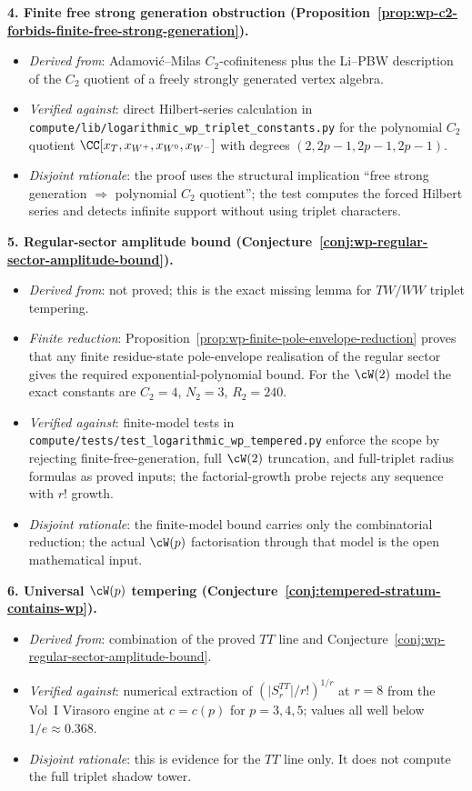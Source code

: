 \textbf{4. Finite free strong generation obstruction
(Proposition~\ref{prop:wp-c2-forbids-finite-free-strong-generation}).}
\begin{itemize}[nosep]
\item \emph{Derived from}: Adamovi\'c--Milas $C_2$-cofiniteness plus
 the Li--PBW description of the $C_2$ quotient of a freely strongly
 generated vertex algebra.
\item \emph{Verified against}: direct Hilbert-series calculation in
 \texttt{compute/lib/logarithmic\_wp\_triplet\_constants.py} for the
 polynomial $C_2$ quotient
 $\CC[x_T,x_{W^+},x_{W^0},x_{W^-}]$ with degrees
 $(2,2p-1,2p-1,2p-1)$.
\item \emph{Disjoint rationale}: the proof uses the structural
 implication ``free strong generation $\Rightarrow$ polynomial
 $C_2$ quotient''; the test computes the forced Hilbert series and
 detects infinite support without using triplet characters.
\end{itemize}

\textbf{5. Regular-sector amplitude bound
(Conjecture~\ref{conj:wp-regular-sector-amplitude-bound}).}
\begin{itemize}[nosep]
\item \emph{Derived from}: not proved; this is the exact missing
 lemma for $TW/WW$ triplet tempering.
\item \emph{Finite reduction}: Proposition~\ref{prop:wp-finite-pole-envelope-reduction}
 proves that any finite residue-state pole-envelope realisation of
 the regular sector gives the required exponential-polynomial bound.
 For the $\cW(2)$ model the exact constants are
 $C_2=4$, $N_2=3$, $R_2=240$.
\item \emph{Verified against}: finite-model
 tests in \texttt{compute/tests/test\_logarithmic\_wp\_tempered.py}
 enforce the scope by rejecting finite-free-generation, full
 $\cW(2)$ truncation, and full-triplet radius formulas as proved
 inputs; the factorial-growth probe rejects any sequence with $r!$
 growth.
\item \emph{Disjoint rationale}: the finite-model bound carries only
 the combinatorial reduction; the actual $\cW(p)$ factorisation
 through that model is the open mathematical input.
\end{itemize}

\textbf{6. Universal $\cW(p)$ tempering
(Conjecture~\ref{conj:tempered-stratum-contains-wp}).}
\begin{itemize}[nosep]
\item \emph{Derived from}: combination of
 the proved $TT$ line and
 Conjecture~\ref{conj:wp-regular-sector-amplitude-bound}.
\item \emph{Verified against}: numerical extraction of
 $(\lvert S_r^{TT} \rvert / r!)^{1/r}$ at $r = 8$ from the Vol~I
 Virasoro engine at $c = c(p)$ for $p = 3, 4, 5$; values all
 well below $1/e \approx 0.368$.
\item \emph{Disjoint rationale}: this is evidence for the $TT$ line
 only. It does not compute the full triplet shadow tower.
\end{itemize}

